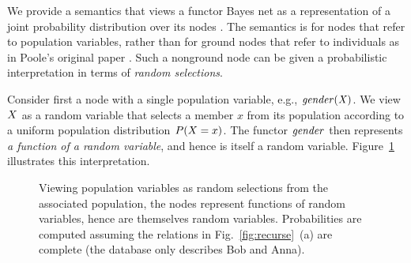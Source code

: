 \documentclass[oribibl]{llncs}
\begin{document}
We provide a semantics that views a functor Bayes net as a representation of a joint probability distribution over its nodes \cite[Sec.14.2]{Russell2010}. The semantics is for nodes that refer to population variables, rather than for ground nodes that refer to individuals as in Poole's original paper \cite{Poole2003}. Such a nonground node can be given a probabilistic interpretation in terms of {\em random selections}. 


Consider first a node with a single population variable, e.g., $\it{gender}(X)$. We view $X$ as a random variable that selects a member $x$ from its population according to a uniform population distribution $P(X = x)$. The functor $\it{gender}$ then represents {\em a function of a random variable}, and hence is itself a random variable. Figure~\ref{fig:random-vars} illustrates this interpretation. 

\begin{figure}[t] %
   \centering
\caption{Viewing population variables as random selections from the associated population, the  nodes represent functions of random variables, hence are themselves random variables. Probabilities are computed assuming the relations in Fig.~\ref{fig:recurse}~(a) are complete (the database only describes Bob and Anna). 
}
\label{fig:random-vars}
\end{figure}
\end{document}
